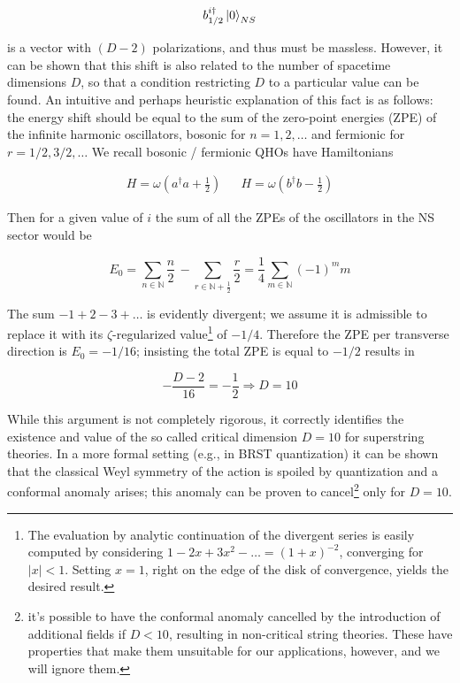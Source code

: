 \begin{equation}
	b_{1/2}^{i\dagger} \ket{0}_{NS}
	\label{}
\end{equation}

is a vector with $(D-2)$ polarizations, and thus must be massless. However, it can be shown that this shift is also related to the number of spacetime dimensions $D$, so that a condition restricting $D$ to a particular value can be found. An intuitive and perhaps heuristic explanation of this fact is as follows: the energy shift should be equal to the sum of the zero-point energies (ZPE) of the infinite harmonic oscillators, bosonic for $n = 1, 2, \ldots $  and fermionic for $r= 1/2, 3/2, \ldots$ We recall bosonic / fermionic QHOs have Hamiltonians

\begin{align}
	H = \omega \left( a^\dagger a + \frac{1}{2} \right) && H = \omega \left( b^\dagger b - \frac{1}{2} \right)
	\label{}
\end{align}

Then for a given value of $i$ the sum of all the ZPEs of the oscillators in the NS sector would be

\begin{equation}
	E_0 =	\sum_{n\in \mathbb{N}} \frac{n}{2} \,- \sum_{r \in \mathbb{N}+\frac{1}{2}} \frac{r}{2} = \frac{1}{4} \sum_{m \in \mathbb{N}} (-1)^m m
	\label{}
\end{equation}

The sum $-1 + 2 - 3 + \ldots$ is evidently divergent; we assume it is admissible to replace it with its $\zeta$-regularized value\footnote{The evaluation by analytic continuation of the divergent series is easily computed by considering $1-2x + 3x^2 - \ldots = (1+x)^{-2}$, converging for $|x|<1$. Setting $x=1$, right on the edge of the disk of convergence, yields the desired result.} of $-1/4$. Therefore the ZPE per transverse direction is $E_0 = -1/16$; insisting the total ZPE is equal to $-1/2$ results in

\begin{equation}
	-\frac{D-2}{16} = -\frac{1}{2} \Rightarrow D = 10
	\label{}
\end{equation}

While this argument is not completely rigorous, it correctly identifies the existence and value of the so called critical dimension $D=10$ for superstring theories. In a more formal setting (e.g., in BRST quantization) it can be shown that the classical Weyl symmetry of the action is spoiled by quantization and a conformal anomaly arises; this anomaly can be proven to cancel\footnote{it's possible to have the conformal anomaly cancelled by the introduction of additional fields if $D<10$, resulting in non-critical string theories. These have properties that make them unsuitable for our applications, however, and we will ignore them.} only for $D=10$.

